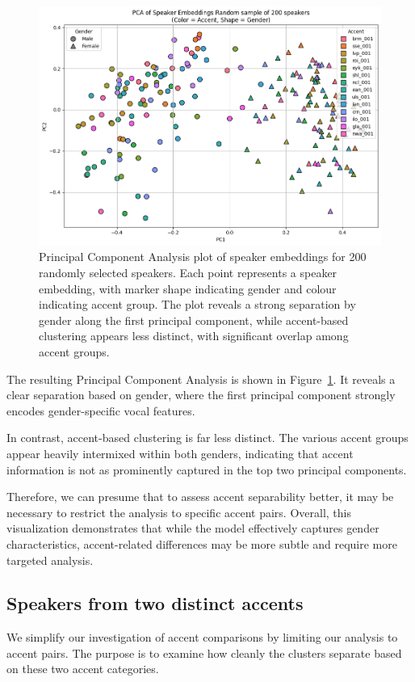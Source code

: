 \documentclass[conference]{IEEEtran}
\begin{document}
\begin{figure}[H]
	\centering
	\includegraphics[width=0.7\linewidth]{img/img-cluster-all}
	\caption{Principal Component Analysis plot of speaker embeddings for 200 randomly selected speakers. Each point represents a speaker embedding, with marker shape indicating gender and colour indicating accent group. The plot reveals a strong separation by gender along the first principal component, while accent-based clustering appears less distinct, with significant overlap among accent groups.}
	\label{fig:img-cluster-all}
\end{figure}


The resulting Principal Component Analysis is shown in Figure~\ref{fig:img-cluster-all}. It reveals a clear separation based on gender, where the first principal component strongly encodes gender-specific vocal features. 

In contrast, accent-based clustering is far less distinct. The various accent groups appear heavily intermixed within both genders, indicating that accent information is not as prominently captured in the top two principal components. 


Therefore, we can presume that to assess accent separability better, it may be necessary to restrict the analysis to specific accent pairs. Overall, this visualization demonstrates that while the model effectively captures gender characteristics, accent-related differences may be more subtle and require more targeted analysis.



\subsection{Speakers from two distinct accents}

We simplify our investigation of accent comparisons by limiting our analysis to accent pairs. The purpose is to examine how cleanly the clusters separate based on these two accent categories.
\end{document}
